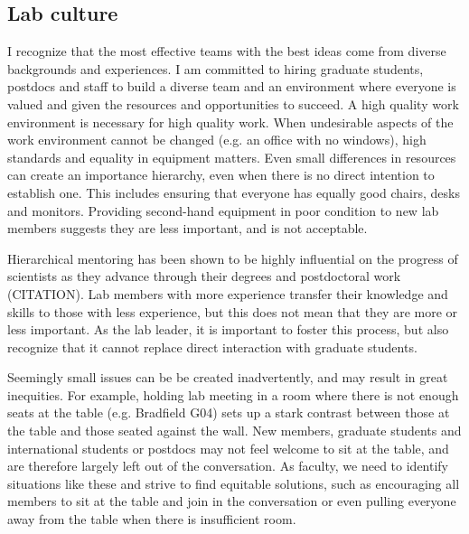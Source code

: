 \documentclass[11pt]{article}
\begin{document}
\subsection*{Lab culture}





I recognize that the most effective teams with the best ideas come from diverse backgrounds and experiences. I am committed to hiring graduate students, postdocs and staff to build a diverse team and an environment where everyone is valued and given the resources and opportunities to succeed. A high quality work environment is necessary for high quality work. When undesirable aspects of the work environment cannot be changed (e.g. an office with no windows), high standards and equality in equipment matters. Even small differences in resources can create an importance hierarchy, even when there is no direct intention to establish one. This includes ensuring that everyone has equally good chairs, desks and monitors. Providing second-hand equipment in poor condition to new lab members suggests they are less important, and is not acceptable.


Hierarchical mentoring has been shown to be highly influential on the progress of scientists as they advance through their degrees and postdoctoral work (CITATION). Lab members with more experience transfer their knowledge and skills to those with less experience, but this does not mean that they are more or less important. As the lab leader, it is important to foster this process, but also recognize that it cannot replace direct interaction with graduate students.  


Seemingly small issues can be be created inadvertently, and may result in great inequities. For example, holding lab meeting in a room where there is not enough seats at the table (e.g. Bradfield G04) sets up a stark contrast between those at the table and those seated against the wall. New members, graduate students and international students or postdocs may not feel welcome to sit at the table, and are therefore largely left out of the conversation. As faculty, we need to identify situations like these and strive to find equitable solutions, such as encouraging all members to sit at the table and join in the conversation or even pulling everyone away from the table when there is insufficient room. 
\end{document}
